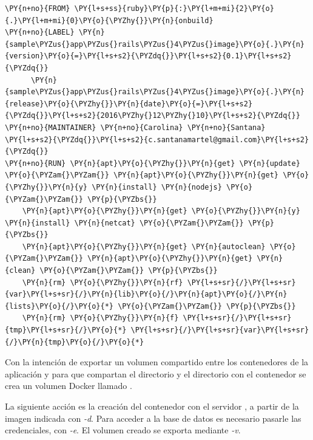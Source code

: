 \begin{codelisting}
\label{code:dockerfile}
\begin{Verbatim}[fontsize=\relsize{-2.5},fontseries=b,commandchars=\\\{\}]
\PY{n+no}{FROM} \PY{l+s+ss}{ruby}\PY{p}{:}\PY{l+m+mi}{2}\PY{o}{.}\PY{l+m+mi}{0}\PY{o}{\PYZhy{}}\PY{n}{onbuild}
\PY{n+no}{LABEL} \PY{n}{sample\PYZus{}app\PYZus{}rails\PYZus{}4\PYZus{}image}\PY{o}{.}\PY{n}{version}\PY{o}{=}\PY{l+s+s2}{\PYZdq{}}\PY{l+s+s2}{0.1}\PY{l+s+s2}{\PYZdq{}} 
      \PY{n}{sample\PYZus{}app\PYZus{}rails\PYZus{}4\PYZus{}image}\PY{o}{.}\PY{n}{release}\PY{o}{\PYZhy{}}\PY{n}{date}\PY{o}{=}\PY{l+s+s2}{\PYZdq{}}\PY{l+s+s2}{2016\PYZhy{}12\PYZhy{}10}\PY{l+s+s2}{\PYZdq{}}
\PY{n+no}{MAINTAINER} \PY{n+no}{Carolina} \PY{n+no}{Santana} \PY{l+s+s2}{\PYZdq{}}\PY{l+s+s2}{c.santanamartel@gmail.com}\PY{l+s+s2}{\PYZdq{}}
\PY{n+no}{RUN} \PY{n}{apt}\PY{o}{\PYZhy{}}\PY{n}{get} \PY{n}{update} \PY{o}{\PYZam{}\PYZam{}} \PY{n}{apt}\PY{o}{\PYZhy{}}\PY{n}{get} \PY{o}{\PYZhy{}}\PY{n}{y} \PY{n}{install} \PY{n}{nodejs} \PY{o}{\PYZam{}\PYZam{}} \PY{p}{\PYZbs{}}
    \PY{n}{apt}\PY{o}{\PYZhy{}}\PY{n}{get} \PY{o}{\PYZhy{}}\PY{n}{y} \PY{n}{install} \PY{n}{netcat} \PY{o}{\PYZam{}\PYZam{}} \PY{p}{\PYZbs{}}
    \PY{n}{apt}\PY{o}{\PYZhy{}}\PY{n}{get} \PY{n}{autoclean} \PY{o}{\PYZam{}\PYZam{}} \PY{n}{apt}\PY{o}{\PYZhy{}}\PY{n}{get} \PY{n}{clean} \PY{o}{\PYZam{}\PYZam{}} \PY{p}{\PYZbs{}}
    \PY{n}{rm} \PY{o}{\PYZhy{}}\PY{n}{rf} \PY{l+s+sr}{/}\PY{l+s+sr}{var}\PY{l+s+sr}{/}\PY{n}{lib}\PY{o}{/}\PY{n}{apt}\PY{o}{/}\PY{n}{lists}\PY{o}{/}\PY{o}{*} \PY{o}{\PYZam{}\PYZam{}} \PY{p}{\PYZbs{}}
    \PY{n}{rm} \PY{o}{\PYZhy{}}\PY{n}{f} \PY{l+s+sr}{/}\PY{l+s+sr}{tmp}\PY{l+s+sr}{/}\PY{o}{*} \PY{l+s+sr}{/}\PY{l+s+sr}{var}\PY{l+s+sr}{/}\PY{n}{tmp}\PY{o}{/}\PY{o}{*}
\end{Verbatim}
\end{codelisting}

Con la intención de exportar un volumen compartido entre los contenedores de la aplicación y  para que compartan el directorio  y el directorio  con el contenedor  se crea un volumen Docker llamado .

La siguiente acción es la creación del contenedor  con el servidor , a partir de la imagen  indicada con \textit{\--d}. Para acceder a la base de datos es necesario pasarle las credenciales, con \textit{\--e}. El volumen creado se exporta mediante \textit{\--v}.


